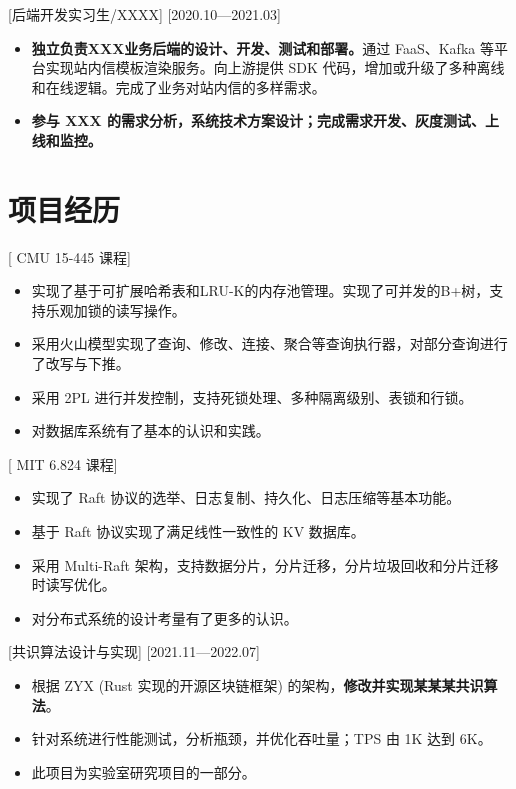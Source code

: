 \documentclass{resume}
\begin{document}
[后端开发实习生/XXXX]
[2020.10—2021.03] 

\begin{itemize}
  \item \textbf{独立负责XXX业务后端的设计、开发、测试和部署。}通过 FaaS、Kafka 等平台实现站内信模板渲染服务。向上游提供 SDK 代码，增加或升级了多种离线和在线逻辑。完成了业务对站内信的多样需求。
  \item \textbf{参与 XXX 的需求分析，系统技术方案设计；完成需求开发、灰度测试、上线和监控。}
\end{itemize}

\section{项目经历}

[ \textnormal{CMU 15-445} 课程]
\begin{itemize}
  \item 实现了基于可扩展哈希表和LRU-K的内存池管理。实现了可并发的B+树，支持乐观加锁的读写操作。
  \item 采用火山模型实现了查询、修改、连接、聚合等查询执行器，对部分查询进行了改写与下推。
  \item 采用 2PL 进行并发控制，支持死锁处理、多种隔离级别、表锁和行锁。
  \item 对数据库系统有了基本的认识和实践。
\end{itemize}


[ \textnormal{MIT 6.824} 课程]
\begin{itemize}
  \item 实现了 Raft 协议的选举、日志复制、持久化、日志压缩等基本功能。
  \item 基于 Raft 协议实现了满足线性一致性的 KV 数据库。
  \item 采用 Multi-Raft 架构，支持数据分片，分片迁移，分片垃圾回收和分片迁移时读写优化。
  \item 对分布式系统的设计考量有了更多的认识。
\end{itemize}

[共识算法设计与实现]
[2021.11—2022.07] 

\begin{itemize}
  \item 根据 ZYX (Rust 实现的开源区块链框架) 的架构，\textbf{修改并实现某某某共识算法}。
  \item 针对系统进行性能测试，分析瓶颈，并优化吞吐量；TPS 由 1K 达到 6K。
  \item 此项目为实验室研究项目的一部分。
\end{itemize}
\end{document}
